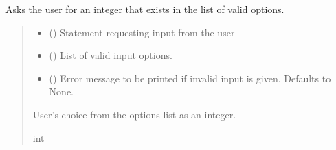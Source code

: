 \documentclass[letterpaper,10pt,english]{sphinxmanual}
\begin{document}
\begin{fulllineitems}
\begin{fulllineitems}
\label{\detokenize{GetUserInput:GetUserInput.UserInput.AskForIntInList}}
\pysigstartsignatures
{}
\pysigstopsignatures
\sphinxAtStartPar
Asks the user for an integer that exists in the list of valid options.
\begin{quote}\begin{description}
\begin{itemize}
\item {} 
\sphinxAtStartPar
{} () \textendash{} Statement requesting input from the user

\item {} 
\sphinxAtStartPar
{} () \textendash{} List of valid input options.

\item {} 
\sphinxAtStartPar
{} (\sphinxstyleliteralemphasis{\sphinxupquote{ | }}\sphinxstyleliteralemphasis{\sphinxupquote{, }}) \textendash{} Error message to be printed if invalid input is given.                 Defaults to None.

\end{itemize}

\sphinxAtStartPar
User’s choice from the options list as an integer.

\sphinxAtStartPar
int

\end{description}\end{quote}

\end{fulllineitems}


\end{fulllineitems}
\end{document}
